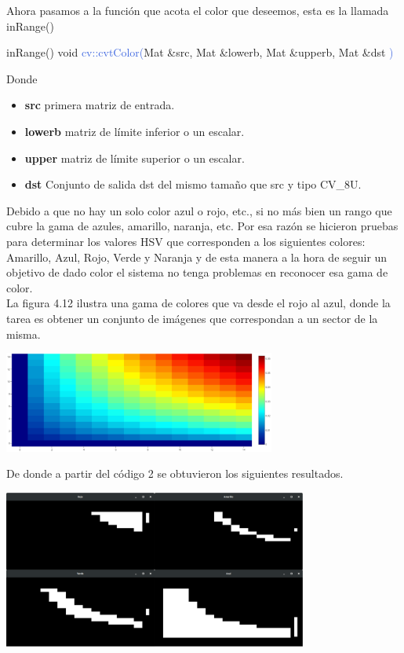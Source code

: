 Ahora pasamos a la función que acota el color que deseemos, esta es la llamada inRange()
\begin{example}[label={ex:serie}]{inRange()}
	\textcolor{Mulberry}{void} \textcolor{RoyalBlue}{cv::cvtColor(}\textcolor{BurntOrange}{Mat}
	\textcolor{Mulberry}{\&}\textcolor{Bittersweet}{src}, \textcolor{BurntOrange}{Mat} \textcolor{Mulberry}{\&}\textcolor{Bittersweet}{lowerb},
	\textcolor{BurntOrange}{Mat} \textcolor{Mulberry}{\&}\textcolor{Bittersweet}{upperb},
	\textcolor{BurntOrange}{Mat} \textcolor{Mulberry}{\&}\textcolor{Bittersweet}{dst}
	\textcolor{RoyalBlue}{)}
\end{example}
Donde
\begin{itemize}
	\item \textbf{src} primera matriz de entrada.
	\item \textbf{lowerb} matriz de límite inferior o un escalar.
	\item \textbf{upper}  matriz de límite superior o un escalar.
	\item \textbf{dst} Conjunto de salida dst del mismo tamaño que src y tipo CV\_8U.
\end{itemize}
Debido a que no hay un solo color azul o rojo, etc., si no más bien un rango que cubre
la gama de azules, amarillo, naranja, etc. Por esa razón se hicieron pruebas para
determinar los valores HSV que corresponden a los siguientes colores: Amarillo, Azul,
Rojo, Verde y Naranja y de esta manera a la hora de seguir un objetivo de dado color
el sistema no tenga problemas en reconocer esa gama de color.\\
La figura 4.12 ilustra una gama de colores que va desde el rojo al azul, donde la
tarea es obtener un conjunto de imágenes que correspondan a un sector de la misma.
\begin{center}
	\includegraphics[width=0.67\textwidth]{Contenido/Cuerpo/Capitulo4/Fig4.eps}
	\label{Fig6}
\end{center}
De donde a partir del código 2 se obtuvieron los siguientes resultados.
\begin{center}
	\includegraphics[width=0.75\textwidth]{Contenido/Cuerpo/Capitulo4/Fig5.eps}
	\label{Fig6}
\end{center}
